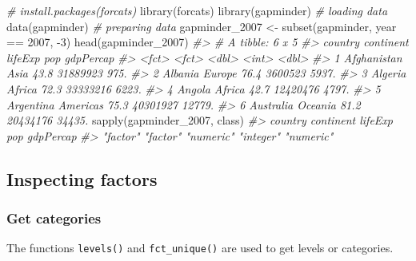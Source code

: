 \documentclass[
]{book}
\newenvironment{Shaded}{\begin{snugshade}}{\end{snugshade}}
\newcommand{\CommentTok}[1]{\textcolor[rgb]{0.56,0.35,0.01}{\textit{#1}}}
\newcommand{\DecValTok}[1]{\textcolor[rgb]{0.00,0.00,0.81}{#1}}
\newcommand{\FunctionTok}[1]{\textcolor[rgb]{0.00,0.00,0.00}{#1}}
\newcommand{\NormalTok}[1]{#1}
\newcommand{\OtherTok}[1]{\textcolor[rgb]{0.56,0.35,0.01}{#1}}
\newcommand{\SpecialCharTok}[1]{\textcolor[rgb]{0.00,0.00,0.00}{#1}}
\begin{document}
\begin{Shaded}
\begin{Highlighting}[]
\CommentTok{\# install.packages(forcats)}
\FunctionTok{library}\NormalTok{(forcats)}
\FunctionTok{library}\NormalTok{(gapminder)}
\CommentTok{\# loading data}
\FunctionTok{data}\NormalTok{(gapminder)}
\CommentTok{\# preparing data}
\NormalTok{gapminder\_2007 }\OtherTok{\textless{}{-}} \FunctionTok{subset}\NormalTok{(gapminder, year }\SpecialCharTok{==} \DecValTok{2007}\NormalTok{, }\SpecialCharTok{{-}}\DecValTok{3}\NormalTok{)}
\FunctionTok{head}\NormalTok{(gapminder\_2007)}
\CommentTok{\#\textgreater{} \# A tibble: 6 x 5}
\CommentTok{\#\textgreater{}   country     continent lifeExp      pop gdpPercap}
\CommentTok{\#\textgreater{}   \textless{}fct\textgreater{}       \textless{}fct\textgreater{}       \textless{}dbl\textgreater{}    \textless{}int\textgreater{}     \textless{}dbl\textgreater{}}
\CommentTok{\#\textgreater{} 1 Afghanistan Asia         43.8 31889923      975.}
\CommentTok{\#\textgreater{} 2 Albania     Europe       76.4  3600523     5937.}
\CommentTok{\#\textgreater{} 3 Algeria     Africa       72.3 33333216     6223.}
\CommentTok{\#\textgreater{} 4 Angola      Africa       42.7 12420476     4797.}
\CommentTok{\#\textgreater{} 5 Argentina   Americas     75.3 40301927    12779.}
\CommentTok{\#\textgreater{} 6 Australia   Oceania      81.2 20434176    34435.}
\FunctionTok{sapply}\NormalTok{(gapminder\_2007, class)}
\CommentTok{\#\textgreater{}   country continent   lifeExp       pop gdpPercap }
\CommentTok{\#\textgreater{}  "factor"  "factor" "numeric" "integer" "numeric"}
\end{Highlighting}
\end{Shaded}

\hypertarget{inspecting-factors}{%
\subsection{Inspecting factors}\label{inspecting-factors}}

\hypertarget{get-categories}{%
\subsubsection{Get categories}\label{get-categories}}

The functions \texttt{levels()} and \texttt{fct\_unique()} are used to get levels or categories.

\begin{Shaded}
\end{Shaded}
\end{document}
